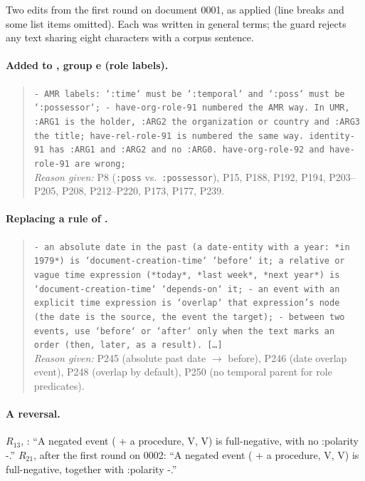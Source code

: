 Two edits from the first round on document 0001, as applied (line breaks and some list items omitted). Each was written in general terms; the guard rejects any text sharing eight characters with a corpus sentence.

\paragraph{Added to , group e (role labels).}
\begin{quote}\small\raggedright
\texttt{- AMR labels: `:time` must be `:temporal` and `:poss` must be `:possessor`; - have-org-role-91 numbered the AMR way. In UMR, :ARG1 is the holder, :ARG2 the organization or country and :ARG3 the title; have-rel-role-91 is numbered the same way. identity-91 has :ARG1 and :ARG2 and no :ARG0. have-org-role-92 and have-role-91 are wrong;}\\
\emph{Reason given:} P8 (\texttt{:poss} vs.\ \texttt{:possessor}), P15, P188, P192, P194, P203--P205, P208, P212--P220, P173, P177, P239.
\end{quote}

\paragraph{Replacing a rule of .}
\begin{quote}\small\raggedright
\texttt{- an absolute date in the past (a date-entity with a year: *in 1979*) is `document-creation-time` `before` it; a relative or vague time expression (*today*, *last week*, *next year*) is `document-creation-time` `depends-on` it; - an event with an explicit time expression is `overlap` that expression's node (the date is the source, the event the target); - between two events, use `before` or `after` only when the text marks an order (then, later, as a result). [\ldots]}\\
\emph{Reason given:} P245 (absolute past date $\rightarrow$ before), P246 (date overlap event), P248 (overlap by default), P250 (no temporal parent for role predicates).
\end{quote}

\paragraph{A reversal.} $R_{13}$, : ``A negated event ( + a procedure,  V, V) is full-negative, with no :polarity -.'' $R_{21}$, after the first round on 0002: ``A negated event ( + a procedure,  V, V) is full-negative, together with :polarity -.''

